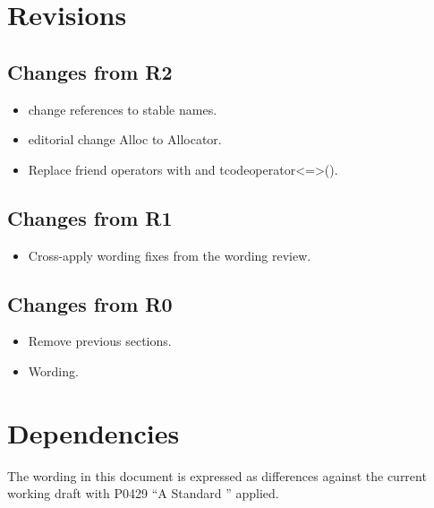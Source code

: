 \section{Revisions}

\subsection{Changes from R2}

\begin{itemize}
  \item change references to stable names.
  \item editorial change Alloc to Allocator.
  \item Replace friend operators with  and tcode{operator<=>()}.
\end{itemize}

\subsection{Changes from R1}

\begin{itemize}
  \item Cross-apply wording fixes from the  wording review.
\end{itemize}

\subsection{Changes from R0}

\begin{itemize}
  \item Remove previous sections.
  \item Wording.
\end{itemize}

\section{Dependencies}

The wording in this document is expressed as differences against the current
working draft with P0429 ``A Standard '' applied.
